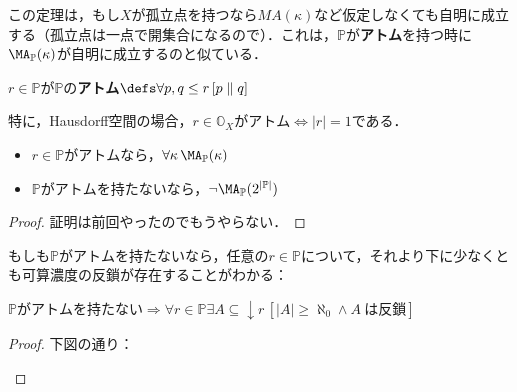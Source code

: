 \documentclass[a4j]{ltjsarticle}
\theoremstyle{definition}
\begin{document}
この定理は，もし$X$が孤立点を持つなら$MA(\kappa)$など仮定しなくても自明に成立する（孤立点は一点で開集合になるので）．これは，$\mathbb{P}$が\textbf{アトム}を持つ時に$\MA_{\mathbb{P}}(\kappa)$が自明に成立するのと似ている．
\begin{definition}
 $r \in \mathbb{P}$が$\mathbb{P}$の\textbf{アトム}$\defs \forall p, q \leq r \, [p \mathrel{\|} q]$
\end{definition}

特に，Hausdorff空間の場合，$r\in \mathbb{O}_X$がアトム$\Leftrightarrow |r| = 1$である．

\begin{lemma}
 \begin{itemize}
  \item $r \in \mathbb{P}$がアトムなら，$\forall \kappa \, \MA_{\mathbb{P}}(\kappa)$
  \item $\mathbb{P}$がアトムを持たないなら，$\neg \MA_{\mathbb{P}}(2^{|\mathbb{P}|})$
 \end{itemize}
\end{lemma}
\begin{proof}
 証明は前回やったのでもうやらない．\mbox{}
\end{proof}

もしも$\mathbb{P}$がアトムを持たないなら，任意の$r \in \mathbb{P}$について，それより下に少なくとも可算濃度の反鎖が存在することがわかる：

\begin{lemma}
 $\mathbb{P}$がアトムを持たない$ \Rightarrow \forall r \in \mathbb{P} \exists A \subseteq \mathop{\downarrow} r \, [|A| \geq \aleph_0 \wedge A\ \text{は反鎖}]$
\end{lemma}
\begin{proof}
 下図の通り：
 \begin{center}
 \end{center}
\end{proof}
\end{document}
